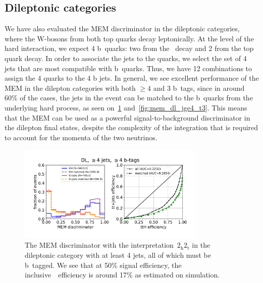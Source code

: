 \subsection{Dileptonic categories}
We have also evaluated the MEM discriminator in the dileptonic categories, where the W-bosons from both top quarks decay leptonically. At the level of the hard interaction, we expect 4 b~quarks: two from the \Hbb~decay and 2 from the top quark decay. In order to associate the jets to the quarks, we select the set of 4 jets that are most compatible with b~quarks. Thus, we have 12 combinations to assign the 4 quarks to the 4 b jets. In general, we see excellent performance of the MEM in the dilepton categories with both $\geq4$  and 3 b~tags, since in around 60\% of the cases, the jets in the event can be matched to the b~quarks from the underlying hard process, as seen on~\cref{fig:mem_dl_jge4_tge4} and~\cref{fig:mem_dl_jge4_t3}. This means that the MEM can be used as a powerful signal-to-background discriminator in the dilepton final states, despite the complexity of the integration that is required to account for the momenta of the two neutrinos.


\begin{figure}[ht]
\begin{centering}
\includegraphics[width = 0.8\textwidth]{figures/mem/mem_dl_jge4_tge4.pdf}
\caption[MEM with the~$2_{\mathrm{h}} 2_{\mathrm{t}}$ interpretation in the dileptonic $\ge4$ jet, $\ge4$ b~tag category]{The MEM discriminator with the interpretation~$2_{\mathrm{h}} 2_{\mathrm{t}}$ in the dileptonic category with at least 4 jets, all of which must be b~tagged. We see that at 50\% signal efficiency, the inclusive~\ttbar~efficiency is around 17\% as estimated on simulation.}
\label{fig:mem_dl_jge4_tge4}
\end{centering}
\end{figure}

